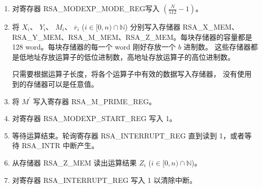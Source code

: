 \documentclass[main\_\_CN.tex]{subfiles}
\begin{document}
\begin{enumerate}

    \item 对寄存器 RSA\_MODEXP\_MODE\_REG写入 \begin{math}( \frac{N}{512} - 1 )\end{math}。

    \item 将
        \begin{math}X_{i}\end{math}、
        \begin{math}Y_{i}\end{math}、
        \begin{math}M_{i}\end{math}、
        \begin{math}\overline{r}_{i}\end{math}
        (\begin{math}i \in [0,n) \cap \mathbb{N}\end{math})
        分别写入存储器 RSA\_X\_MEM、RSA\_Y\_MEM、RSA\_M\_MEM、RSA\_Z\_MEM。每块存储器的容量都是 128 word。每块存储器的每一个 word 刚好存放一个 \begin{math}b\end{math} 进制数。
        这些存储器都是低地址存放运算子的低位进制数，高地址存放运算子的高位进制数。
        
        只需要根据运算子长度，将各个运算子中有效的数据写入存储器，
        没有使用到的存储器可以是任意值。
        
    \item 将 \begin{math}M^{\prime}\end{math} 写入寄存器 RSA\_M\_PRIME\_REG。

    \item 对寄存器 RSA\_MODEXP\_START\_REG 写入 1。

    \item 等待运算结束。轮询寄存器 RSA\_INTERRUPT\_REG 直到读到 1，或者等待 RSA\_INTR 中断产生。
        
    \item 从存储器 RSA\_Z\_MEM 读出运算结果 \begin{math}Z_{i}\end{math} (\begin{math}i \in [0,n) \cap \mathbb{N}\end{math})。

    \item 对寄存器 RSA\_INTERRUPT\_REG 写入 1 以清除中断。

\end{enumerate}
\end{document}
